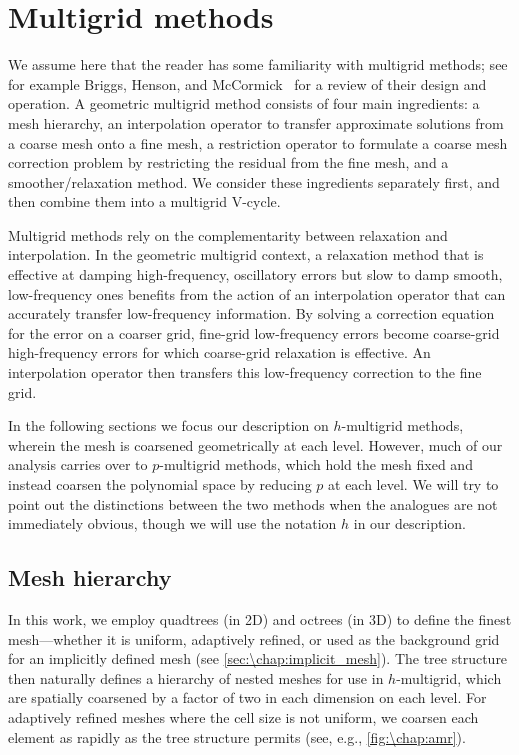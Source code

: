 \section{Multigrid methods}\label{sec:\chap:multigrid}
We assume here that the reader has some familiarity with multigrid methods; see for example Briggs, Henson, and McCormick~\cite{Briggs_00_01} for a review of their design and operation. A geometric multigrid method consists of four main ingredients: a mesh hierarchy, an interpolation operator to transfer approximate solutions from a coarse mesh onto a fine mesh, a restriction operator to formulate a coarse mesh correction problem by restricting the residual from the fine mesh, and a smoother/relaxation method. We consider these ingredients separately first, and then combine them into a multigrid V-cycle.

Multigrid methods rely on the complementarity between relaxation and interpolation. In the geometric multigrid context, a relaxation method that is effective at damping high-frequency, oscillatory errors but slow to damp smooth, low-frequency ones benefits from the action of an interpolation operator that can accurately transfer low-frequency information. By solving a correction equation for the error on a coarser grid, fine-grid low-frequency errors become coarse-grid high-frequency errors for which coarse-grid relaxation is effective. An interpolation operator then transfers this low-frequency correction to the fine grid.

In the following sections we focus our description on $h$-multigrid methods, wherein the mesh is coarsened geometrically at each level. However, much of our analysis carries over to $p$-multigrid methods, which hold the mesh fixed and instead coarsen the polynomial space by reducing $p$ at each level. We will try to point out the distinctions between the two methods when the analogues are not immediately obvious, though we will use the notation $h$ in our description.

\subsection{Mesh hierarchy}
In this work, we employ quadtrees (in 2D) and octrees (in 3D) to define the finest mesh---whether it is uniform, adaptively refined, or used as the background grid for an implicitly defined mesh (see \cref{sec:\chap:implicit_mesh}). The tree structure then naturally defines a hierarchy of nested meshes for use in $h$-multigrid, which are spatially coarsened by a factor of two in each dimension on each level. For adaptively refined meshes where the cell size is not uniform, we coarsen each element as rapidly as the tree structure permits (see, e.g., \cref{fig:\chap:amr}).

